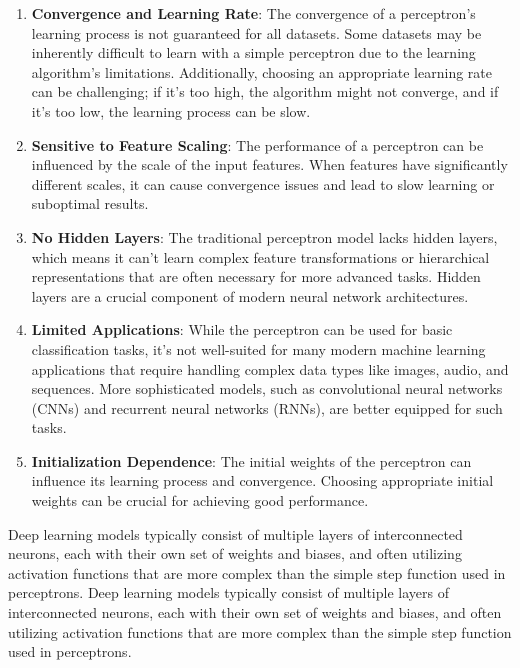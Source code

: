 \documentclass{report}
\begin{document}
\begin{enumerate}
    \item \textbf{Convergence and Learning Rate}: The convergence of a perceptron's learning process is not guaranteed for all datasets. Some datasets may be inherently difficult to learn with a simple perceptron due to the learning algorithm's limitations. Additionally, choosing an appropriate learning rate can be challenging; if it's too high, the algorithm might not converge, and if it's too low, the learning process can be slow.

    \item \textbf{Sensitive to Feature Scaling}: The performance of a perceptron can be influenced by the scale of the input features. When features have significantly different scales, it can cause convergence issues and lead to slow learning or suboptimal results.

    \item \textbf{No Hidden Layers}: The traditional perceptron model lacks hidden layers, which means it can't learn complex feature transformations or hierarchical representations that are often necessary for more advanced tasks. Hidden layers are a crucial component of modern neural network architectures.

    \item \textbf{Limited Applications}: While the perceptron can be used for basic classification tasks, it's not well-suited for many modern machine learning applications that require handling complex data types like images, audio, and sequences. More sophisticated models, such as convolutional neural networks (CNNs) and recurrent neural networks (RNNs), are better equipped for such tasks.

    \item \textbf{Initialization Dependence}: The initial weights of the perceptron can influence its learning process and convergence. Choosing appropriate initial weights can be crucial for achieving good performance.
\end{enumerate}


Deep learning models typically consist of multiple layers of interconnected neurons, each with their own set of weights and biases, and often utilizing activation functions that are more complex than the simple step function used in perceptrons. Deep learning models typically consist of multiple layers of interconnected neurons, each with their own set of weights and biases, and often utilizing activation functions that are more complex than the simple step function used in perceptrons.
\end{document}
